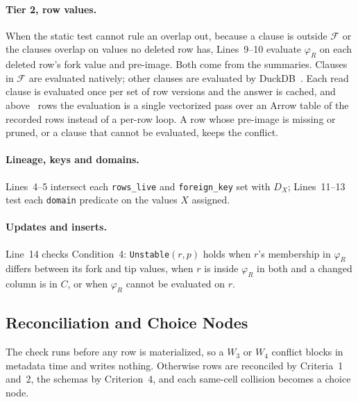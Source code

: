 \documentclass[sigconf, nonacm]{acmart}
\begin{document}
\paragraph{Tier 2, row values.} When the static test cannot rule an overlap out, because a clause is outside $\mathcal{F}$ or the clauses overlap on values no deleted row has, Lines~9--10 evaluate $\varphi_R$ on each deleted row's fork value and pre-image. Both come from the summaries. Clauses in $\mathcal{F}$ are evaluated natively; other clauses are evaluated by DuckDB~\cite{raasveldt2019duckdb}. Each read clause is evaluated once per set of row versions and the answer is cached, and above \VecThreshold\ rows the evaluation is a single vectorized pass over an Arrow table of the recorded rows instead of a per-row loop. A row whose pre-image is missing or pruned, or a clause that cannot be evaluated, keeps the conflict.

\paragraph{Lineage, keys and domains.} Lines~4--5 intersect each \texttt{rows\_live} and \texttt{foreign\_key} set with $D_X$; Lines~11--13 test each \texttt{domain} predicate on the values $X$ assigned.

\paragraph{Updates and inserts.} Line~14 checks Condition~4: \texttt{Unstable}$(r, p)$ holds when $r$'s membership in $\varphi_R$ differs between its fork and tip values, when $r$ is inside $\varphi_R$ in both and a changed column is in $C$, or when $\varphi_R$ cannot be evaluated on $r$.

\subsection{Reconciliation and Choice Nodes}
\label{sec:design_vsa}

The check runs before any row is materialized, so a $W_3$ or $W_4$ conflict blocks in metadata time and writes nothing. Otherwise rows are reconciled by Criteria~1 and~2, the schemas by Criterion~4, and each same-cell collision becomes a choice node.
\end{document}
